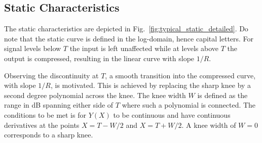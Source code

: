\documentclass[../main2.tex]{subfiles}
\begin{document}
\subsection{Static Characteristics}
The static characteristics are depicted in Fig.~\ref{fig:typical_static_detailed}. Do note that the static curve is defined in the log-domain, hence capital letters. For signal levels below $T$ the input is left unaffected while at levels above $T$ the output is compressed, resulting in the linear curve with slope $1/R$. 

Observing the discontinuity at $T$, a smooth transition into the compressed curve, with slope $1/R$, is motivated. This is achieved by replacing the sharp knee by a second degree polynomial\cite{frindle1996implementation}\cite{reiss2012tutorial} across the knee. The knee width $W$ is defined as the range in dB spanning either side of $T$ where such a polynomial is connected. The conditions to be met is for $Y(X)$ to be continuous and have continuous derivatives at the points $X=T-W/2$ and $X=T+W/2$. A knee width of $W=0$ corresponds to a sharp knee. 
\end{document}
